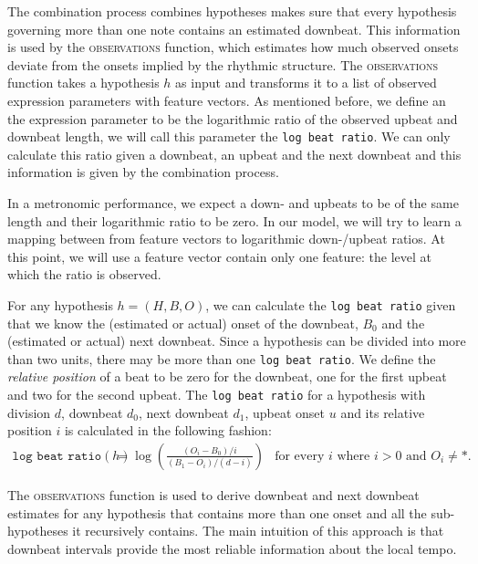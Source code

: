 The combination process combines hypotheses makes sure that every hypothesis governing more than one note contains an estimated downbeat. This information is used by the \textsc{observations} function, which estimates how much observed onsets deviate from the onsets implied by the rhythmic structure. The \textsc{observations} function takes a hypothesis $h$ as input and transforms it to a list of observed expression parameters with feature vectors. As mentioned before, we define an the expression parameter to be the logarithmic ratio of the observed upbeat and downbeat length, we will call this parameter the \texttt{log beat ratio}. We can only calculate this ratio given a downbeat, an upbeat and the next downbeat and this information is given by the combination process. 

In a metronomic performance, we expect a down- and upbeats to be of the same length and their logarithmic ratio to be zero. In our model, we will try to learn a mapping between from feature vectors to logarithmic down-/upbeat ratios. At this point, we will use a feature vector contain only one feature: the level at which the ratio is observed. 


For any hypothesis $h = (H, B, O)$, we can calculate the \texttt{log beat ratio} given that we know the (estimated or actual) onset of the downbeat, $B_0$ and the (estimated or actual) next downbeat. Since a hypothesis can be divided into more than two units, there may be more than one \texttt{log beat ratio}. We define the \textit{relative position} of a beat to be zero for the downbeat, one for the first upbeat and two for the second upbeat. The \texttt{log beat ratio} for a hypothesis with division $d$, downbeat $d_0$, next downbeat $d_1$, upbeat onset $u$ and its relative position $i$ is calculated in the following fashion:
\begin{align}
\label{eq:expression}
\texttt{log beat ratio}(h) &= \log\left(\frac{(O_i - B_0) / i}{(B_1 - O_i) / (d - i)}\right) & \text{for every $i$ where $i > 0$ and $O_i \neq *$.}
\end{align}

The \textsc{observations} function is used to derive downbeat and next downbeat estimates for any hypothesis that contains more than one onset and all the sub-hypotheses it recursively contains. The main intuition of this approach is that downbeat intervals provide the most reliable information about the local tempo. 

